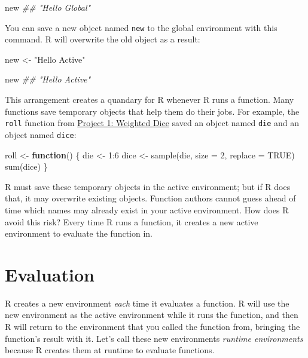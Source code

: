\documentclass[
  letterpaper,
  DIV=11,
  numbers=noendperiod]{scrbook}
\newenvironment{Shaded}{\begin{snugshade}}{\end{snugshade}}
\newcommand{\AttributeTok}[1]{\textcolor[rgb]{0.40,0.45,0.13}{#1}}
\newcommand{\ConstantTok}[1]{\textcolor[rgb]{0.56,0.35,0.01}{#1}}
\newcommand{\ControlFlowTok}[1]{\textcolor[rgb]{0.00,0.23,0.31}{\textbf{#1}}}
\newcommand{\DecValTok}[1]{\textcolor[rgb]{0.68,0.00,0.00}{#1}}
\newcommand{\DocumentationTok}[1]{\textcolor[rgb]{0.37,0.37,0.37}{\textit{#1}}}
\newcommand{\FunctionTok}[1]{\textcolor[rgb]{0.28,0.35,0.67}{#1}}
\newcommand{\NormalTok}[1]{\textcolor[rgb]{0.00,0.23,0.31}{#1}}
\newcommand{\OtherTok}[1]{\textcolor[rgb]{0.00,0.23,0.31}{#1}}
\newcommand{\SpecialCharTok}[1]{\textcolor[rgb]{0.37,0.37,0.37}{#1}}
\newcommand{\StringTok}[1]{\textcolor[rgb]{0.13,0.47,0.30}{#1}}
\begin{document}
\begin{Shaded}
\begin{Highlighting}[]
\NormalTok{new}
\DocumentationTok{\#\# "Hello Global"}
\end{Highlighting}
\end{Shaded}

You can save a new object named \texttt{new} to the global environment
with this command. R will overwrite the old object as a result:

\begin{Shaded}
\begin{Highlighting}[]
\NormalTok{new }\OtherTok{\textless{}{-}} \StringTok{"Hello Active"}

\NormalTok{new}
\DocumentationTok{\#\# "Hello Active"}
\end{Highlighting}
\end{Shaded}

This arrangement creates a quandary for R whenever R runs a function.
Many functions save temporary objects that help them do their jobs. For
example, the \texttt{roll} function from
\hyperref[sec-project-1]{Project 1: Weighted Dice} saved an object named
\texttt{die} and an object named \texttt{dice}:

\begin{Shaded}
\begin{Highlighting}[]
\NormalTok{roll }\OtherTok{\textless{}{-}} \ControlFlowTok{function}\NormalTok{() \{}
\NormalTok{  die }\OtherTok{\textless{}{-}} \DecValTok{1}\SpecialCharTok{:}\DecValTok{6}
\NormalTok{  dice }\OtherTok{\textless{}{-}} \FunctionTok{sample}\NormalTok{(die, }\AttributeTok{size =} \DecValTok{2}\NormalTok{, }\AttributeTok{replace =} \ConstantTok{TRUE}\NormalTok{)}
  \FunctionTok{sum}\NormalTok{(dice)}
\NormalTok{\}}
\end{Highlighting}
\end{Shaded}

R must save these temporary objects in the active environment; but if R
does that, it may overwrite existing objects. Function authors cannot
guess ahead of time which names may already exist in your active
environment. How does R avoid this risk? Every time R runs a function,
it creates a new active environment to evaluate the function in.

\section{Evaluation}\label{evaluation}

R creates a new environment \emph{each} time it evaluates a function. R
will use the new environment as the active environment while it runs the
function, and then R will return to the environment that you called the
function from, bringing the function's result with it. Let's call these
new environments \emph{runtime environments} because R creates them at
runtime to evaluate functions.
\end{document}

